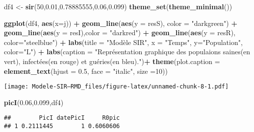 \documentclass[
]{article}
\newenvironment{Shaded}{\begin{snugshade}}{\end{snugshade}}
\newcommand{\DataTypeTok}[1]{\textcolor[rgb]{0.13,0.29,0.53}{#1}}
\newcommand{\DecValTok}[1]{\textcolor[rgb]{0.00,0.00,0.81}{#1}}
\newcommand{\FloatTok}[1]{\textcolor[rgb]{0.00,0.00,0.81}{#1}}
\newcommand{\KeywordTok}[1]{\textcolor[rgb]{0.13,0.29,0.53}{\textbf{#1}}}
\newcommand{\NormalTok}[1]{#1}
\newcommand{\OperatorTok}[1]{\textcolor[rgb]{0.81,0.36,0.00}{\textbf{#1}}}
\newcommand{\StringTok}[1]{\textcolor[rgb]{0.31,0.60,0.02}{#1}}
\begin{document}
\begin{Shaded}
\begin{Highlighting}[]
\NormalTok{df4 <-}\StringTok{ }\KeywordTok{sir}\NormalTok{(}\DecValTok{50}\NormalTok{,}\FloatTok{0.01}\NormalTok{,}\FloatTok{0.78885555}\NormalTok{,}\FloatTok{0.06}\NormalTok{,}\FloatTok{0.099}\NormalTok{)}
\KeywordTok{theme_set}\NormalTok{(}\KeywordTok{theme_minimal}\NormalTok{())}

\KeywordTok{ggplot}\NormalTok{(df4, }\KeywordTok{aes}\NormalTok{(}\DataTypeTok{x=}\NormalTok{j)) }\OperatorTok{+}\StringTok{ }\KeywordTok{geom_line}\NormalTok{(}\KeywordTok{aes}\NormalTok{(}\DataTypeTok{y =}\NormalTok{ resS), }\DataTypeTok{color =} \StringTok{"darkgreen"}\NormalTok{) }\OperatorTok{+}\StringTok{ }\KeywordTok{geom_line}\NormalTok{(}\KeywordTok{aes}\NormalTok{(}\DataTypeTok{y =}\NormalTok{ resI),}\DataTypeTok{color =} \StringTok{"darkred"}\NormalTok{) }\OperatorTok{+}\StringTok{ }\KeywordTok{geom_line}\NormalTok{(}\KeywordTok{aes}\NormalTok{(}\DataTypeTok{y =}\NormalTok{ resR), }\DataTypeTok{color=}\StringTok{"steelblue"}\NormalTok{) }\OperatorTok{+}\StringTok{ }\KeywordTok{labs}\NormalTok{(}\DataTypeTok{title =} \StringTok{"Modèle SIR"}\NormalTok{, }\DataTypeTok{x =} \StringTok{"Temps"}\NormalTok{, }\DataTypeTok{y=}\StringTok{"Population"}\NormalTok{, }\DataTypeTok{color=}\StringTok{"L"}\NormalTok{) }\OperatorTok{+}\StringTok{ }\KeywordTok{labs}\NormalTok{(}\DataTypeTok{caption =} \StringTok{"Représentation graphique des populaions saines(en vert), infectées(en rouge) et guéries(en bleu)."}\NormalTok{)}\OperatorTok{+}\StringTok{ }\KeywordTok{theme}\NormalTok{(}\DataTypeTok{plot.caption =} \KeywordTok{element_text}\NormalTok{(}\DataTypeTok{hjust =} \FloatTok{0.5}\NormalTok{, }\DataTypeTok{face =} \StringTok{"italic"}\NormalTok{, }\DataTypeTok{size =}\DecValTok{10}\NormalTok{)) }
\end{Highlighting}
\end{Shaded}

\texttt{[image: Modele-SIR---RMD\_files/figure-latex/unnamed-chunk-8-1.pdf]}

\begin{Shaded}
\begin{Highlighting}[]
\KeywordTok{picI}\NormalTok{(}\FloatTok{0.06}\NormalTok{,}\FloatTok{0.099}\NormalTok{,df4)}
\end{Highlighting}
\end{Shaded}

\begin{verbatim}
##        PicI datePicI     R0pic
## 1 0.2111445        1 0.6060606
\end{verbatim}
\end{document}
